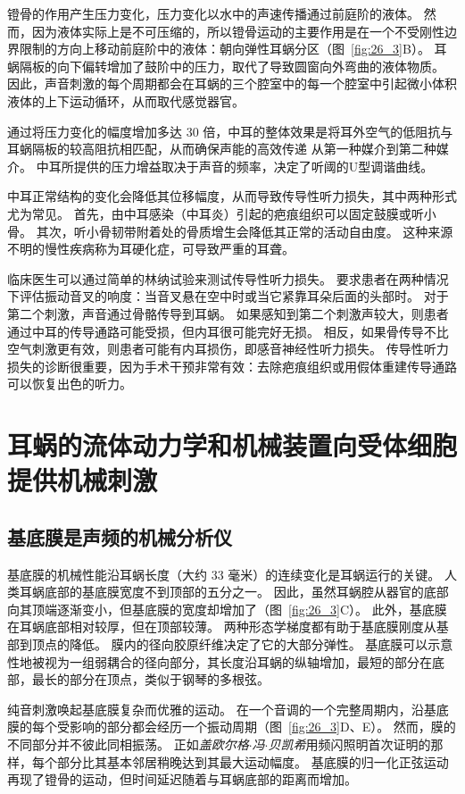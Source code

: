 镫骨的作用产生压力变化，压力变化以水中的声速传播通过前庭阶的液体。
然而，因为液体实际上是不可压缩的，所以镫骨运动的主要作用是在一个不受刚性边界限制的方向上移动前庭阶中的液体：朝向弹性耳蜗分区（图~\ref{fig:26_3}B）。
耳蜗隔板的向下偏转增加了鼓阶中的压力，取代了导致圆窗向外弯曲的液体物质。
因此，声音刺激的每个周期都会在耳蜗的三个腔室中的每一个腔室中引起微小体积液体的上下运动循环，从而取代感觉器官。


通过将压力变化的幅度增加多达 30 倍，中耳的整体效果是将耳外空气的低阻抗与耳蜗隔板的较高阻抗相匹配，从而确保声能的高效传递 从第一种媒介到第二种媒介。
中耳所提供的压力增益取决于声音的频率，决定了听阈的U型调谐曲线。


中耳正常结构的变化会降低其位移幅度，从而导致传导性听力损失，其中两种形式尤为常见。
首先，由中耳感染（中耳炎）引起的疤痕组织可以固定鼓膜或听小骨。
其次，听小骨韧带附着处的骨质增生会降低其正常的活动自由度。
这种来源不明的慢性疾病称为耳硬化症，可导致严重的耳聋。


临床医生可以通过简单的林纳试验来测试传导性听力损失。
要求患者在两种情况下评估振动音叉的响度：当音叉悬在空中时或当它紧靠耳朵后面的头部时。
对于第二个刺激，声音通过骨骼传导到耳蜗。
如果感知到第二个刺激声较大，则患者通过中耳的传导通路可能受损，但内耳很可能完好无损。
相反，如果骨传导不比空气刺激更有效，则患者可能有内耳损伤，即感音神经性听力损失。
传导性听力损失的诊断很重要，因为手术干预非常有效：去除疤痕组织或用假体重建传导通路可以恢复出色的听力。



\section{耳蜗的流体动力学和机械装置向受体细胞提供机械刺激}

\subsection{基底膜是声频的机械分析仪}

基底膜的机械性能沿耳蜗长度（大约 33 毫米）的连续变化是耳蜗运行的关键。
人类耳蜗底部的基底膜宽度不到顶部的五分之一。
因此，虽然耳蜗腔从器官的底部向其顶端逐渐变小，但基底膜的宽度却增加了（图~\ref{fig:26_3}C）。
此外，基底膜在耳蜗底部相对较厚，但在顶部较薄。
两种形态学梯度都有助于基底膜刚度从基部到顶点的降低。
膜内的径向胶原纤维决定了它的大部分弹性。
基底膜可以示意性地被视为一组弱耦合的径向部分，其长度沿耳蜗的纵轴增加，最短的部分在底部，最长的部分在顶点，类似于钢琴的多根弦。


纯音刺激唤起基底膜复杂而优雅的运动。
在一个音调的一个完整周期内，沿基底膜的每个受影响的部分都会经历一个振动周期（图~\ref{fig:26_3}D、E）。
然而，膜的不同部分并不彼此同相振荡。
正如\textit{盖欧尔格$\cdot$冯$\cdot$贝凯希}用频闪照明首次证明的那样，每个部分比其基本邻居稍晚达到其最大运动幅度。
基底膜的归一化正弦运动再现了镫骨的运动，但时间延迟随着与耳蜗底部的距离而增加。


